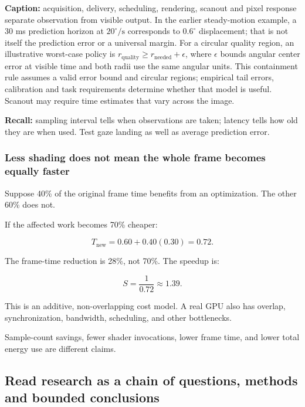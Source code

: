 
\textbf{Caption:} acquisition, delivery, scheduling, rendering, scanout and pixel response separate observation from visible output. In the earlier steady-motion example, a 30 ms prediction horizon at \(20^\circ/\mathrm{s}\) corresponds to \(0.6^\circ\) displacement; that is not itself the prediction error or a universal margin. For a circular quality region, an illustrative worst-case policy is \(r_{\mathrm{quality}}\geq r_{\mathrm{needed}}+\epsilon\), where \(\epsilon\) bounds angular center error at visible time and both radii use the same angular units. This containment rule assumes a valid error bound and circular regions; empirical tail errors, calibration and task requirements determine whether that model is useful. Scanout may require time estimates that vary across the image.

\textbf{Recall:} sampling interval tells when observations are taken; latency tells how old they are when used. Test gaze landing as well as average prediction error.

\subsubsection{Less shading does not mean the whole frame becomes equally faster}\label{04-visual-computing-ii-ch043-less-shading-does-not-mean-the-whole-frame-becomes-equally-faster}

\hypertarget{04-visual-computing-ii-ch043-less-shading-does-not-mean-the-whole-frame-becomes-equally-faster}{}

Suppose 40\% of the original frame time benefits from an optimization. The other 60\% does not.

If the affected work becomes 70\% cheaper:

\[
T_{\mathrm{new}}=0.60+0.40(0.30)=0.72.
\]

The frame-time reduction is 28\%, not 70\%. The speedup is:

\[
S=\frac1{0.72}\approx1.39.
\]

This is an additive, non-overlapping cost model. A real GPU also has overlap, synchronization, bandwidth, scheduling, and other bottlenecks.

Sample-count savings, fewer shader invocations, lower frame time, and lower total energy use are different claims.

\subsection{Read research as a chain of questions, methods and bounded conclusions}\label{04-visual-computing-ii-ch043-read-research-as-a-chain-of-questions-methods-and-bounded-conclusions}

